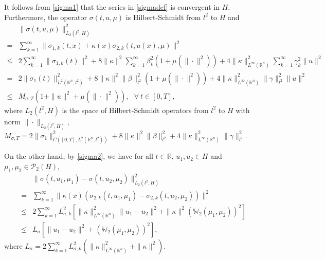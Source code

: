 \documentclass[11pt]{article}
\numberwithin{equation}{section}
\theoremstyle{plain}
\def\leq{\leqslant}
\begin{document}
 It follows from \eqref{sigma1} that the series in \eqref{sigmadef} is convergent in $H$.
 Furthermore, the operator $\sigma(t,u,\mu)$ is Hilbert-Schmidt from $l^2$ to $H$ and
\begin{align} \label{sigma3}
        & \|\sigma(t,u,\mu)\|_{L_2(l^2, H)}^2  \nonumber \\
      = & \sum_{k=1}^\infty \| \sigma_{1,k}(t,x) + \kappa(x) \sigma_{2,k} (t, u(x), \mu ) \|^2
           \nonumber \\
   \leq & 2 \sum_{k=1}^\infty \| \sigma_{1,k}(t) \|^2
          + 8 \| \kappa \|^2 \sum_{k=1}^\infty \beta_{k}^2 \left( 1 + \mu( \|\cdot\|^2) \right)
          + 4 \| \kappa \|_{L^\infty(\mathbb{R}^n)}^2 \sum_{k=1}^\infty \gamma_{k}^2 \| u \|^2  \nonumber\\
      = & 2 \| \sigma_{1}(t) \|_{L^2(\mathbb{R}^n, l^2)}^2
          + 8 \| \kappa \|^2 \| \beta \|_{l^2}^2 \left( 1 + \mu( \|\cdot\|^2) \right)
          + 4 \| \kappa \|_{L^\infty(\mathbb{R}^n)}^2 \| \gamma\|_{l^2}^2 \| u \|^2
             \nonumber \\
   \leq & M_{\sigma,T} \left( 1 + \| u \|^2 + \mu( \|\cdot\|^2) \right),
          \ \ \ \forall \ t \in [0,T],
\end{align}
 where $L_2(l^2, H)$ is the space of Hilbert-Schmidt operators from $l^2$ to $H$ with norm $\| \cdot \|_{L_2(l^2, H)}$,
 $M_{\sigma,T} = 2 \| \sigma_{1} \|_{C([0,T]; L^2(\mathbb{R}^n, l^2) )}^2
                 + 8 \| \kappa \|^2 \| \beta \|_{l^2}^2
                 + 4 \| \kappa \|_{L^\infty(\mathbb{R}^n)}^2 \| \gamma\|_{l^2}^2$.

 On the other hand, by \eqref{sigma2},
 we have for all $t \in \mathbb{R}$, $u_1, u_2 \in H$ and $\mu_1, \mu_2 \in \mathcal {P}_2(H)$,
\begin{align} \label{sigmalip}
     & \| \sigma (t, u_1, \mu_1) -\sigma (t, u_2, \mu_2)\|^2 _{L_2(l^2, H)}
          \nonumber \\
   = & \sum_{k=1}^\infty
            \| \kappa(x)
                      \left( \sigma_{2,k} (t, u_1, \mu_1)
                              - \sigma_{2,k} (t, u_2, \mu_2)
                      \right)
            \|^2  \nonumber \\
  \leq &
       2  \sum_{k=1}^\infty
        L_{\sigma,k}^2
                    \left[ \| \kappa \|_{L^\infty(\mathbb{R}^n)}^2
                    \| u_1 - u_2 \|^2
                           +
                           \| \kappa\|^2 \left( \mathbb{W}_2 (\mu_1, \mu_2)
                             \right)^2
                    \right]
                           \nonumber \\
  \leq & L_{\sigma} \left[ \| u_1 - u_2 \|^2
                           + \left( \mathbb{W}_2 (\mu_1, \mu_2)
                             \right)^2
                    \right],
\end{align}
 where
      $L_{\sigma} =
      2 \sum_{k=1}^\infty L_{\sigma,k}^2
      \left (
      \| \kappa \|_{L^\infty(\mathbb{R}^n)}^2
      +\| \kappa \|^2
      \right ) $.
\end{document}
